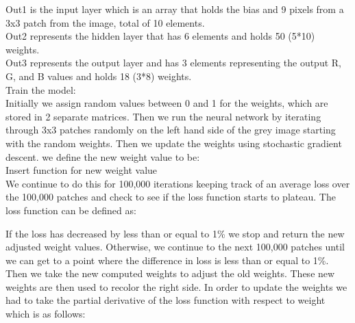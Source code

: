 \documentclass{article}
\theoremstyle{definition}
\begin{document}
        \begin{figure}[H]
            \centering
        \end{figure}
                
        Out1 is the input layer which is an array that holds the bias and 9 pixels from a 3x3 patch from the image, total of 10 elements. \\
        Out2 represents the hidden layer that has 6 elements and holds 50 (5*10) weights. \\
        Out3 represents the output layer and has 3 elements representing the output R, G, and B values and holds 18 (3*8) weights. \\
        
        Train the model: \\
        Initially we assign random values between 0 and 1 for the weights, which are stored in 2 separate matrices. Then we run the neural network by iterating through 3x3 patches randomly on the left hand side of the grey image starting with the random weights. Then we update the weights using stochastic gradient descent. we define the new weight value to be: \\
        
        Insert function for new weight value \\
        
        We continue to do this for 100,000 iterations keeping track of an average loss over the 100,000 patches and check to see if the loss function starts to plateau. The loss function can be defined as:\\
        
        \begin{figure}[H]
            \centering
        \end{figure}
        
        If the loss has decreased by less than or equal to 1\% we stop and return the new adjusted weight values. Otherwise, we continue to the next 100,000 patches until we can get to a point where the difference in loss is less than or equal to 1\%. Then we take the new computed weights to adjust the old weights. These new weights are then used to recolor the right side. In order to update the weights we had to take the partial derivative of the loss function with respect to weight which is as follows:\\
        
\end{document}
